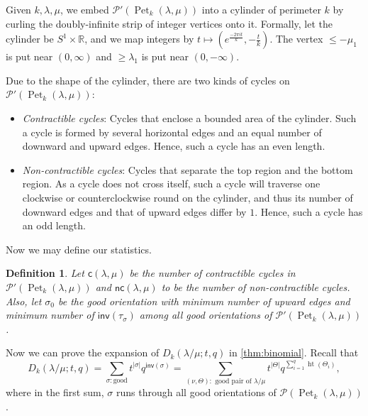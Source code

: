 \documentclass[pdflatex,sn-mathphys-num]{sn-jnl}%
\theoremstyle{thmstyleone}%
\theoremstyle{thmstyletwo}%
\theoremstyle{thmstylethree}%
\newtheorem{definition}[theorem]{Definition}
\numberwithin{equation}{section}
\newcommand{\R}{\mathbb{R}}
\DeclareMathOperator{\Pet}{Pet}
\DeclareMathOperator{\htt}{ht}
\newcommand{\inv}{\mathsf{inv}}
\begin{document}
        Given $k,\lambda,\mu$, we embed $\mathcal{P}'(\Pet_k(\lambda,\mu))$ into a cylinder of perimeter $k$ by curling the doubly-infinite strip of integer vertices onto it. Formally, let the cylinder be $S^1\times \R$, and we map integers by $t\mapsto (e^{\frac{-2\pi i t}{k}}, -\frac{t}{k})$. The vertex $\leq -\mu_1$ is put near $(0,\infty)$ and $\geq \lambda_1$ is put near $(0,-\infty)$. 
        
        Due to the shape of the cylinder, there are two kinds of cycles on $\mathcal{P}'(\Pet_k(\lambda,\mu))$:

        \begin{itemize}
            \item \textit{Contractible cycles}: Cycles that enclose a bounded area of the cylinder. Such a cycle is formed by several horizontal edges and an equal number of downward and upward edges. Hence, such a cycle has an even length.
 
            \item \textit{Non-contractible cycles}: Cycles that separate the top region and the bottom region. As a cycle does not cross itself, such a cycle will traverse one clockwise or counterclockwise round on the cylinder, and thus its number of downward edges and that of upward edges differ by $1$. Hence, such a cycle has an odd length.
        \end{itemize}
        
        Now we may define our statistics.
        \begin{definition}
            
        Let $\mathsf{c}(\lambda,\mu)$ be the number of contractible cycles in $\mathcal{P}'(\Pet_k(\lambda,\mu))$ and $\mathsf{nc}(\lambda,\mu)$ to be the number of non-contractible cycles. Also, let $\sigma_0$ be the good orientation with minimum number of upward edges and minimum number of $\inv(\tau_{\sigma})$ among all good orientations of $\mathcal{P}'(\Pet_k(\lambda,\mu))$.
        \end{definition}

        Now we can prove the expansion of $D_k(\lambda/\mu; t,q)$ in \cref{thm:binomial}. Recall that 
        \[D_k(\lambda/\mu; t,q)= \sum_{\sigma:\text{good}} t^{|\sigma|}q^{\inv(\sigma)} = \sum_{(\nu,\Theta):\text{ good pair of }\lambda/\mu} t^{|\Theta|}q^{\sum_{i=1}^q \htt(\Theta_i)},\]
        where in the first sum, $\sigma$ runs through all good orientations of $\mathcal{P}(\Pet_k(\lambda,\mu))$.
        
\end{document}
